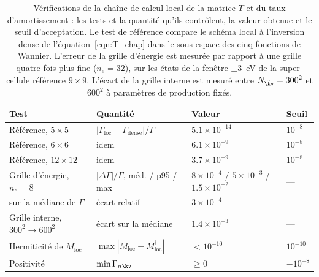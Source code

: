\begin{table}[htbp]
    \centering
    \small
    \setlength{\tabcolsep}{4pt}
    \caption[Vérifications du schéma local.]{Vérifications de la chaîne
    de calcul local de la matrice $T$ et du taux d'amortissement : les tests et la quantité qu'ils contrôlent, la valeur obtenue et le seuil d'acceptation. Le test de
    référence compare le schéma local à l'inversion dense de
    l'équation~\eqref{eqn:T_chap} dans le sous-espace des cinq fonctions
    de Wannier. L'erreur de la grille d'énergie est mesurée par rapport à
    une grille quatre fois plus fine ($n_e = 32$), sur les états de la
    fenêtre $\pm3$~eV de la super-cellule référence $9\times9$. L'écart de la grille interne est mesuré entre $N_{\tilde\kv}=300^2$ et $600^2$ à paramètres de production fixés.}
    \label{tab:tests_T}
    \begin{tabular}{l l l l}
        \hline\hline
        Test & Quantité & Valeur & Seuil \\
        \hline
        Référence, $5\times5$ & $|\Gamma_\text{loc}-\Gamma_\text{dense}|/\Gamma$ & $5.1\times10^{-14}$ & $10^{-8}$ \\
        Référence, $6\times6$ & idem & $6.1\times10^{-9}$ & $10^{-8}$ \\
        Référence, $12\times12$ & idem & $3.7\times10^{-9}$ & $10^{-8}$ \\
        Grille d'énergie, $n_e = 8$ & $|\Delta\Gamma|/\Gamma$, méd. / p95 / max & $8\times10^{-4}$ / $5\times10^{-3}$ / $1.5\times10^{-2}$ & --- \\
        \quad sur la médiane de $\Gamma$ & écart relatif & $3\times10^{-4}$ & --- \\
        Grille interne, $300^2\to600^2$ & écart sur la médiane & $1.4\times10^{-3}$ & --- \\
        Hermiticité de $M_\text{loc}$ & $\max|M_\text{loc}-M_\text{loc}^\dagger|$ & $<10^{-10}$ & $10^{-10}$ \\
        Positivité & $\min\Gamma_{n\kv}$ & $\ge 0$ & $-10^{-8}$ \\
        \hline\hline
    \end{tabular}
\end{table}

\newpage
{}

